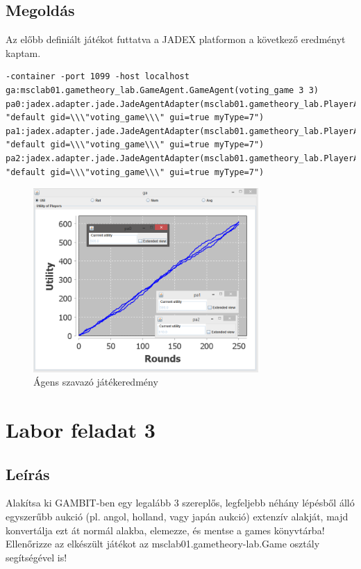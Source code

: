 \subsection{Megoldás}
Az előbb definiált játékot futtatva a JADEX platformon a következő eredményt kaptam.
\begin{lstlisting}[caption=Szavazás run config, frame=single,float=!ht]
-container -port 1099 -host localhost 
ga:msclab01.gametheory_lab.GameAgent.GameAgent(voting_game 3 3) pa0:jadex.adapter.jade.JadeAgentAdapter(msclab01.gametheory_lab.PlayerAgent.Player 
"default gid=\\\"voting_game\\\" gui=true myType=7") 
pa1:jadex.adapter.jade.JadeAgentAdapter(msclab01.gametheory_lab.PlayerAgent.Player 
"default gid=\\\"voting_game\\\" gui=true myType=7")
pa2:jadex.adapter.jade.JadeAgentAdapter(msclab01.gametheory_lab.PlayerAgent.Player 
"default gid=\\\"voting_game\\\" gui=true myType=7")
\end{lstlisting}
\begin{figure}[h]
\begin{center}
\includegraphics[height=7cm]{figures/voting_jadex.png}
\caption{Ágens szavazó játékeredmény}
\end{center}
\end{figure}

\section{Labor feladat 3}
\subsection{Leírás}
Alakítsa ki GAMBIT-ben egy legalább 3 szereplős, legfeljebb néhány lépésből álló egyszerűbb aukció (pl. angol, holland, vagy japán aukció) extenzív alakját, majd konvertálja ezt át normál alakba, elemezze, és mentse a games könyvtárba! Ellenőrizze az elkészült játékot az msclab01.gametheory-lab.Game osztály segítségével is! 
